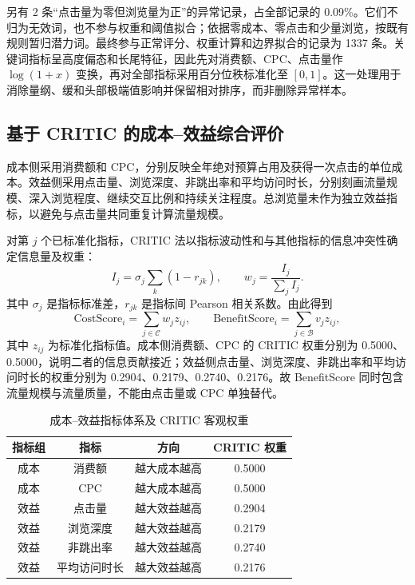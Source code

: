 \documentclass[UTF8,a4paper,zihao=-4]{ctexart}
\begin{document}
另有 2 条“点击量为零但浏览量为正”的异常记录，占全部记录的 0.09\%。它们不归为无效词，也不参与权重和阈值拟合；依据零成本、零点击和少量浏览，按既有规则暂归潜力词。最终参与正常评分、权重计算和边界拟合的记录为 1337 条。关键词指标呈高度偏态和长尾特征，因此先对消费额、CPC、点击量作 $\log(1+x)$ 变换，再对全部指标采用百分位秩标准化至 $[0,1]$。这一处理用于消除量纲、缓和头部极端值影响并保留相对排序，而非删除异常样本。

\subsection{基于 CRITIC 的成本--效益综合评价}

成本侧采用消费额和 CPC，分别反映全年绝对预算占用及获得一次点击的单位成本。效益侧采用点击量、浏览深度、非跳出率和平均访问时长，分别刻画流量规模、深入浏览程度、继续交互比例和持续关注程度。总浏览量未作为独立效益指标，以避免与点击量共同重复计算流量规模。

对第 $j$ 个已标准化指标，CRITIC 法以指标波动性和与其他指标的信息冲突性确定信息量及权重：
\begin{equation}
  I_j=\sigma_j\sum_{k}(1-r_{jk}),\qquad
  w_j=\frac{I_j}{\sum_j I_j}.
  \label{eq:q2-critic}
\end{equation}
其中 $\sigma_j$ 是指标标准差，$r_{jk}$ 是指标间 Pearson 相关系数。由此得到
\begin{equation}
  \mathrm{CostScore}_i=\sum_{j\in\mathcal C}w_jz_{ij},\qquad
  \mathrm{BenefitScore}_i=\sum_{j\in\mathcal B}v_jz_{ij},
  \label{eq:q2-scores}
\end{equation}
其中 $z_{ij}$ 为标准化指标值。成本侧消费额、CPC 的 CRITIC 权重分别为 0.5000、0.5000，说明二者的信息贡献接近；效益侧点击量、浏览深度、非跳出率和平均访问时长的权重分别为 0.2904、0.2179、0.2740、0.2176。故 BenefitScore 同时包含流量规模与流量质量，不能由点击量或 CPC 单独替代。

\begin{table}[H]
  \centering
  \caption{成本--效益指标体系及 CRITIC 客观权重}
  \label{tab:q2-weights}
  \begin{tabular}{cccc}
    \toprule
    指标组 & 指标 & 方向 & CRITIC 权重 \\
    \midrule
    成本 & 消费额 & 越大成本越高 & 0.5000 \\
    成本 & CPC & 越大成本越高 & 0.5000 \\
    效益 & 点击量 & 越大效益越高 & 0.2904 \\
    效益 & 浏览深度 & 越大效益越高 & 0.2179 \\
    效益 & 非跳出率 & 越大效益越高 & 0.2740 \\
    效益 & 平均访问时长 & 越大效益越高 & 0.2176 \\
    \bottomrule
  \end{tabular}
\end{table}
\end{document}
